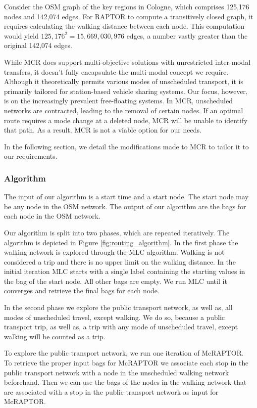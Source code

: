 Consider the OSM graph of the key regions in Cologne, which comprises 125,176 nodes and 142,074 edges.
For RAPTOR to compute a transitively closed graph, it requires calculating the walking distance between each node.
This computation would yield \(125,176^2 = 15,669,030,976\) edges, a number vastly greater than the original 142,074 edges.

While MCR does support multi-objective solutions with unrestricted inter-modal transfers, it doesn't fully encapsulate the multi-modal concept we require.
Although it theoretically permits various modes of unscheduled transport, it is primarily tailored for station-based vehicle sharing systems.
Our focus, however, is on the increasingly prevalent free-floating systems.
In MCR, unscheduled networks are contracted, leading to the removal of certain nodes.
If an optimal route requires a mode change at a deleted node, MCR will be unable to identify that path.
As a result, MCR is not a viable option for our needs.


In the following section, we detail the modifications made to MCR to tailor it to our requirements.

\subsubsection{Algorithm}
\label{subsubsec:algorithm}

The input of our algorithm is a start time and a start node.
The start node may be any node in the OSM network.
The output of our algorithm are the bags for each node in the OSM network.

Our algorithm is split into two phases, which are repeated iteratively.
The algorithm is depicted in Figure \ref{fig:routing_algorithm}.
In the first phase the walking network is explored through the MLC algorithm.
Walking is not considered a trip and there is no upper limit on the walking distance.
In the initial iteration MLC starts with a single label containing the starting values in the bag of the start node.
All other bags are empty.
We run MLC until it converges and retrieve the final bags for each node.

In the second phase we explore the public transport network, as well as, all modes of unscheduled travel, except walking.
We do so, because a public transport trip, as well as, a trip with any mode of unscheduled travel, except walking will be counted as a trip.

To explore the public transport network, we run one iteration of McRAPTOR.
To retrieve the proper input bags for McRAPTOR we associate each stop in the public transport network with a node in the unscheduled walking network beforehand.
Then we can use the bags of the nodes in the walking network that are associated with a stop in the public transport network as input for McRAPTOR.

